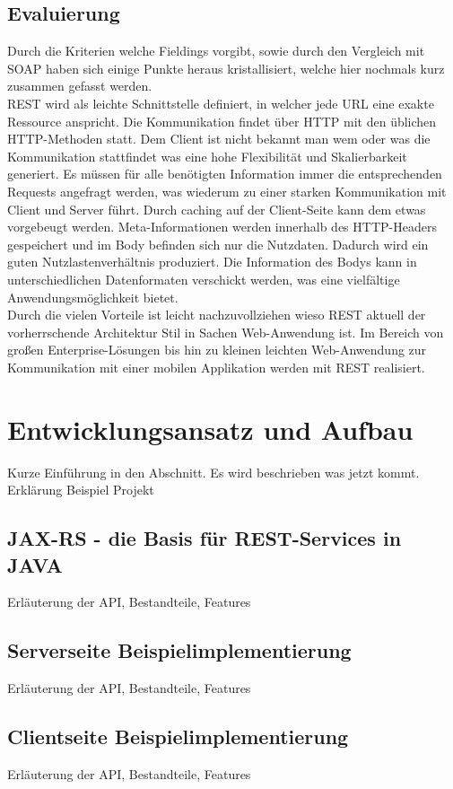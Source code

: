 \documentclass[fleqn,10pt,ngerman]{SelfArx}
\begin{document}
\subsection{Evaluierung}
Durch die Kriterien welche Fieldings vorgibt, sowie durch den Vergleich mit SOAP haben sich einige Punkte heraus kristallisiert, welche hier nochmals kurz zusammen gefasst werden. \\ REST wird als leichte Schnittstelle definiert, in welcher jede URL eine exakte Ressource anspricht. Die Kommunikation findet über HTTP mit den üblichen HTTP-Methoden statt. Dem Client ist nicht bekannt man wem oder was die Kommunikation stattfindet was eine hohe Flexibilität und Skalierbarkeit generiert. Es müssen für alle benötigten Information immer die entsprechenden Requests angefragt werden, was wiederum zu einer starken Kommunikation mit Client und Server führt. Durch caching auf der Client-Seite kann dem etwas vorgebeugt werden. Meta-Informationen werden innerhalb des HTTP-Headers gespeichert und im Body befinden sich nur die Nutzdaten. Dadurch wird ein guten Nutzlastenverhältnis produziert. Die Information des Bodys kann in unterschiedlichen Datenformaten verschickt werden, was eine vielfältige Anwendungsmöglichkeit bietet. \\ Durch die vielen Vorteile ist leicht nachzuvollziehen wieso REST aktuell der vorherrschende Architektur Stil in Sachen Web-Anwendung ist. Im Bereich von großen Enterprise-Lösungen bis hin zu kleinen leichten Web-Anwendung zur Kommunikation mit einer mobilen Applikation werden mit REST realisiert. 

\section{Entwicklungsansatz und Aufbau}
Kurze Einführung in den Abschnitt. Es wird beschrieben was jetzt kommt. Erklärung Beispiel Projekt

\subsection{JAX-RS - die Basis für REST-Services in JAVA}
Erläuterung der API, Bestandteile, Features 

\subsection{Serverseite Beispielimplementierung}
Erläuterung der API, Bestandteile, Features 

\subsection{Clientseite Beispielimplementierung}
Erläuterung der API, Bestandteile, Features 
\end{document}
